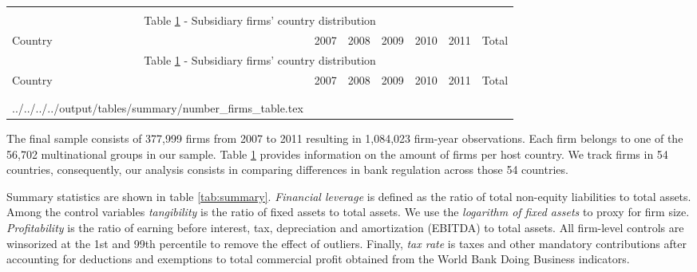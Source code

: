 \documentclass[12pt]{article}
\makeatletter
\newcommand\primitiveinput[1]
{\@@input #1 }
\makeatother
\begin{document}
		\begin{small}
		{
			\begin{longtable}{lrrrrrr}\\
				\label{tab:number of firms}\\
				\multicolumn{7}{c}{Table \ref{tab:number of firms} - Subsidiary firms' country distribution}\\
				\hline \hline \addlinespace Country & 2007 & 2008 & 2009 & 2010 & 2011 & Total  \\
				\endfirsthead
				\multicolumn{7}{c}{Table \ref{tab:number of firms} - Subsidiary firms' country distribution}\\
				\hline \hline \addlinespace Country & 2007 & 2008 & 2009 & 2010 & 2011 & Total  \\
				\hline \addlinespace \endhead
				\hline
				\multicolumn{7}{r}{{\textit{(Continued)}}}\\ \endfoot
				\\ 	
				\endlastfoot
				\primitiveinput{../../../../output/tables/summary/number_firms_table.tex}
				\hline 			
			\end{longtable}	
		}
	\end{small}
	
	The final sample consists of 377,999 firms from 2007 to 2011 resulting in 1,084,023 firm-year observations. Each firm belongs to one of the 56,702 multinational groups in our sample. Table \ref{tab:number of firms} provides information on the amount of firms per host country. We track firms in 54 countries, consequently, our analysis consists in comparing differences in bank regulation across those 54 countries.
	
	Summary statistics are shown in table \ref{tab:summary}. \textit{Financial leverage} is defined as the ratio of total non-equity liabilities to total assets. Among the control variables \textit{tangibility} is the ratio of fixed assets to total assets. We use the \textit{logarithm of fixed assets} to proxy for firm size. \textit{Profitability} is the ratio of earning before interest, tax, depreciation and amortization (EBITDA) to total assets. All firm-level controls are winsorized at the 1st and 99th percentile to remove the effect of outliers. Finally, \textit{tax rate} is taxes and other mandatory contributions after accounting for deductions and exemptions to total commercial profit obtained from the World Bank Doing Business indicators.
	
\end{document}
